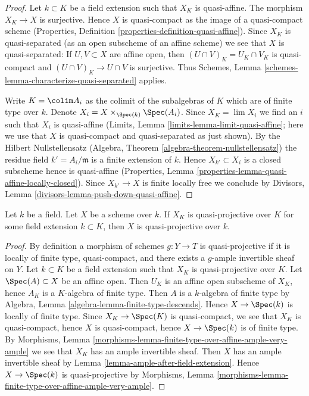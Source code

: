 \begin{proof}
Let $k \subset K$ be a field extension such that $X_K$ is quasi-affine.
The morphism $X_K \to X$ is surjective. Hence $X$ is quasi-compact
as the image of a quasi-compact scheme (Properties, Definition
\ref{properties-definition-quasi-affine}). Since $X_K$ is quasi-separated
(as an open subscheme of an affine scheme)
we see that $X$ is quasi-separated: If $U, V \subset X$ are
affine open, then $(U \cap V)_K = U_K \cap V_K$ is quasi-compact
and $(U \cap V)_K \to U \cap V$ is surjective. Thus
Schemes, Lemma \ref{schemes-lemma-characterize-quasi-separated} applies.

\medskip\noindent
Write $K = \colim A_i$ as the colimit of the subalgebras of $K$
which are of finite type over $k$. Denote
$X_i = X \times_{\Spec(k)} \Spec(A_i)$.
Since $X_K = \lim X_i$ we find an $i$ such that $X_i$ is quasi-affine
(Limits, Lemma \ref{limits-lemma-limit-quasi-affine};
here we use that $X$ is quasi-compact and quasi-separated as
just shown). By the Hilbert Nullstellensatz
(Algebra, Theorem \ref{algebra-theorem-nullstellensatz})
the residue field $k' = A_i/\mathfrak m$ is a finite
extension of $k$. Hence $X_{k'} \subset X_i$ is a closed
subscheme hence is quasi-affine (Properties, Lemma
\ref{properties-lemma-quasi-affine-locally-closed}).
Since $X_{k'} \to X$ is finite locally free we conclude by
Divisors, Lemma \ref{divisors-lemma-push-down-quasi-affine}.
\end{proof}

\begin{lemma}
\label{lemma-quasi-projective-after-field-extension}
Let $k$ be a field. Let $X$ be a scheme over $k$. If $X_K$ is quasi-projective
over $K$ for some field extension $k \subset K$, then $X$ is quasi-projective
over $k$.
\end{lemma}

\begin{proof}
By definition a morphism of schemes $g : Y \to T$ is quasi-projective
if it is locally of finite type, quasi-compact, and there exists
a $g$-ample invertible sheaf on $Y$.
Let $k \subset K$ be a field extension such that $X_K$ is quasi-projective
over $K$. Let $\Spec(A) \subset X$ be an affine open. Then $U_K$ is an
affine open subscheme of $X_K$, hence $A_K$ is a $K$-algebra of finite type.
Then $A$ is a $k$-algebra of finite type by
Algebra, Lemma \ref{algebra-lemma-finite-type-descends}.
Hence $X \to \Spec(k)$ is locally of finite type.
Since $X_K \to \Spec(K)$ is quasi-compact, we see that $X_K$ is
quasi-compact, hence $X$ is quasi-compact, hence $X \to \Spec(k)$
is of finite type. By Morphisms, Lemma
\ref{morphisms-lemma-finite-type-over-affine-ample-very-ample}
we see that $X_K$ has an ample invertible sheaf.
Then $X$ has an ample invertible sheaf by
Lemma \ref{lemma-ample-after-field-extension}.
Hence $X \to \Spec(k)$ is quasi-projective by Morphisms, Lemma
\ref{morphisms-lemma-finite-type-over-affine-ample-very-ample}.
\end{proof}

